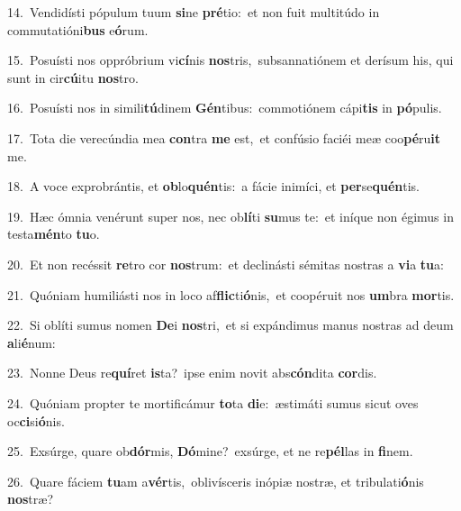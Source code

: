 {\numbfont\textcolor{\numbcolor}{14.}}~Vendidísti pópulum tuum \textbf{si}\-ne \textbf{pré}\-tio:~\star et non fuit multitúdo in commutatióni\textbf{bus} e\-\textbf{ó}\-rum.\par
{\numbfont\textcolor{\numbcolor}{15.}}~Posuísti nos oppróbrium vi\-\textbf{cí}\-nis \textbf{nos}\-tris,~\star subsannatiónem et derísum his, qui sunt in cir\-\textbf{cú}\-itu \textbf{nos}\-tro.\par
{\numbfont\textcolor{\numbcolor}{16.}}~Posuísti nos in simili\-\textbf{tú}\-dinem \textbf{Gén}\-tibus:~\star commotiónem cápi\textbf{tis} in \textbf{pó}\-pulis.\par
{\numbfont\textcolor{\numbcolor}{17.}}~Tota die verecúndia mea \textbf{con}\-tra \textbf{me} est,~\star et confúsio faciéi meæ coo\-\textbf{pé}\-ru\textbf{it} me.\par
{\numbfont\textcolor{\numbcolor}{18.}}~A voce exprobrántis, et \textbf{ob}\-lo\-\textbf{quén}\-tis:~\star a fácie inimíci, et \textbf{per}\-se\-\textbf{quén}\-tis.\par
{\numbfont\textcolor{\numbcolor}{19.}}~Hæc ómnia venérunt super nos, nec ob\-\textbf{lí}\-ti \textbf{su}\-mus te:~\star et iníque non égimus in testa\-\textbf{mén}\-to \textbf{tu}\-o.\par
{\numbfont\textcolor{\numbcolor}{20.}}~Et non recéssit \textbf{re}\-tro cor \textbf{nos}\-trum:~\star et declinásti sémitas nostras a \textbf{vi}\-a \textbf{tu}\-a:\par
{\numbfont\textcolor{\numbcolor}{21.}}~Quóniam humiliásti nos in loco af\-\textbf{flic}\-ti\-\textbf{ó}\-nis,~\star et coopéruit nos \textbf{um}\-bra \textbf{mor}\-tis.\par
{\numbfont\textcolor{\numbcolor}{22.}}~Si oblíti sumus nomen \textbf{De}\-i \textbf{nos}\-tri,~\star et si expándimus manus nostras ad deum \textbf{a}\-li\-\textbf{é}\-num:\par
{\numbfont\textcolor{\numbcolor}{23.}}~Nonne Deus re\-\textbf{quí}\-ret \textbf{is}\-ta?~\star ipse enim novit abs\-\textbf{cón}\-dita \textbf{cor}\-dis.\par
{\numbfont\textcolor{\numbcolor}{24.}}~Quóniam propter te mortificámur \textbf{to}\-ta \textbf{di}\-e:~\star æstimáti sumus sicut oves oc\-\textbf{ci}\-si\-\textbf{ó}\-nis.\par
{\numbfont\textcolor{\numbcolor}{25.}}~Exsúrge, quare ob\-\textbf{dór}\-mis, \textbf{Dó}\-mine?~\star exsúrge, et ne re\-\textbf{pél}\-las in \textbf{fi}\-nem.\par
{\numbfont\textcolor{\numbcolor}{26.}}~Quare fáciem \textbf{tu}\-am a\-\textbf{vér}\-tis,~\star oblivísceris inópiæ nostræ, et tribulati\-\textbf{ó}\-nis \textbf{nos}\-træ?\par
